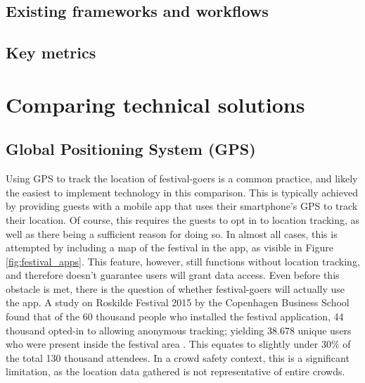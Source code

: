 \subsection{Existing frameworks and workflows}

\subsection{Key metrics}



\section{Comparing technical solutions}

\subsection{Global Positioning System (GPS)}
\label{sec:gps}

Using GPS to track the location of festival-goers is a common practice, and likely the easiest to implement technology in this comparison. This is typically achieved by providing guests with a mobile app that uses their smartphone's GPS to track their location. Of course, this requires the guests to opt in to location tracking, as well as there being a sufficient reason for doing so. In almost all cases, this is attempted by including a map of the festival in the app, as visible in Figure \ref{fig:festival_apps}. This feature, however, still functions without location tracking, and therefore doesn't guarantee users will grant data access. Even before this obstacle is met, there is the question of whether festival-goers will actually use the app. A study on Roskilde Festival 2015 by the Copenhagen Business School  found that of the 60 thousand people who installed the festival application, 44 thousand opted-in to allowing anonymous tracking; yielding 38.678 unique users who were present inside the festival area \cite{rf_app}. This equates to slightly under 30\% of the total 130 thousand attendees. In a crowd safety context, this is a significant limitation, as the location data gathered is not representative of entire crowds.

